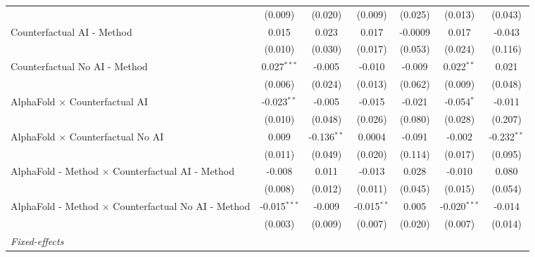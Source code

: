 \begin{tabular}{lcccccc}
                                                              & (0.009)        & (0.020)       & (0.009)       & (0.025)       & (0.013)        & (0.043)\\   
   Counterfactual AI - Method                                 & 0.015          & 0.023         & 0.017         & -0.0009       & 0.017          & -0.043\\   
                                                              & (0.010)        & (0.030)       & (0.017)       & (0.053)       & (0.024)        & (0.116)\\   
   Counterfactual No AI - Method                              & 0.027$^{***}$  & -0.005        & -0.010        & -0.009        & 0.022$^{**}$   & 0.021\\   
                                                              & (0.006)        & (0.024)       & (0.013)       & (0.062)       & (0.009)        & (0.048)\\   
   AlphaFold $\times$ Counterfactual AI                       & -0.023$^{**}$  & -0.005        & -0.015        & -0.021        & -0.054$^{*}$   & -0.011\\   
                                                              & (0.010)        & (0.048)       & (0.026)       & (0.080)       & (0.028)        & (0.207)\\   
   AlphaFold $\times$ Counterfactual No AI                    & 0.009          & -0.136$^{**}$ & 0.0004        & -0.091        & -0.002         & -0.232$^{**}$\\   
                                                              & (0.011)        & (0.049)       & (0.020)       & (0.114)       & (0.017)        & (0.095)\\   
   AlphaFold - Method $\times$ Counterfactual AI - Method     & -0.008         & 0.011         & -0.013        & 0.028         & -0.010         & 0.080\\   
                                                              & (0.008)        & (0.012)       & (0.011)       & (0.045)       & (0.015)        & (0.054)\\   
   AlphaFold - Method $\times$ Counterfactual No AI - Method  & -0.015$^{***}$ & -0.009        & -0.015$^{**}$ & 0.005         & -0.020$^{***}$ & -0.014\\   
                                                              & (0.003)        & (0.009)       & (0.007)       & (0.020)       & (0.007)        & (0.014)\\   
   \midrule
   \emph{Fixed-effects}\\

\end{tabular}
